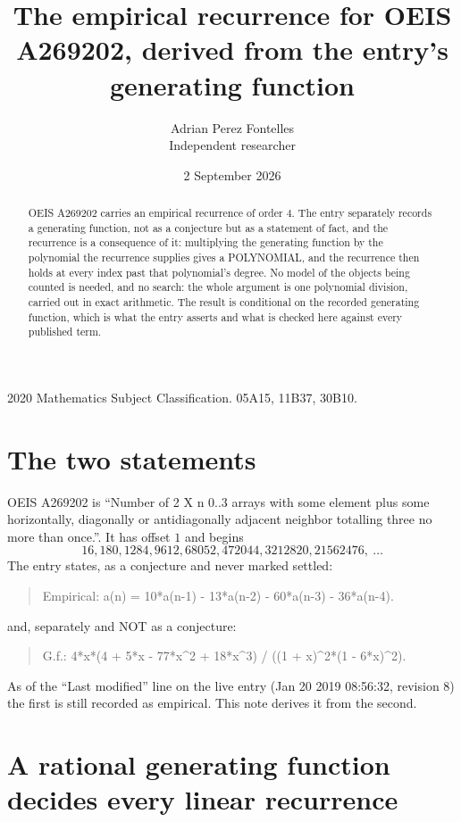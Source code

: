 \documentclass[11pt,a4paper]{article}
\title{The empirical recurrence for OEIS A269202, derived from the entry's generating function}
\author{Adrian Perez Fontelles\\ \small Independent researcher}
\date{2 September 2026}
\theoremstyle{plain}
\theoremstyle{definition}
\begin{document}
\maketitle

\begin{abstract}
OEIS A269202 carries an empirical recurrence of order $4$. The entry separately records a
generating function, not as a conjecture but as a statement of fact, and the recurrence is a
consequence of it: multiplying the generating function by the polynomial the recurrence
supplies gives a POLYNOMIAL, and the recurrence then holds at every index past that
polynomial's degree. No model of the objects being counted is needed, and no search: the
whole argument is one polynomial division, carried out in exact arithmetic. The result is
conditional on the recorded generating function, which is what the entry asserts and what is
checked here against every published term.
\end{abstract}

\noindent\small 2020 Mathematics Subject Classification. 05A15, 11B37, 30B10.\normalsize

\section{The two statements}

OEIS A269202 is ``Number of 2 X n 0..3 arrays with some element plus some horizontally, diagonally or antidiagonally adjacent neighbor totalling three no more than once.''. It has offset $1$ and begins
\[
16, 180, 1284, 9612, 68052, 472044, 3212820, 21562476,\ \dots
\]
The entry states, as a conjecture and never marked settled:
\begin{quote}
Empirical: a(n) = 10*a(n-1) - 13*a(n-2) - 60*a(n-3) - 36*a(n-4).
\end{quote}
and, separately and NOT as a conjecture:
\begin{quote}
G.f.: 4*x*(4 + 5*x - 77*x\^{}2 + 18*x\^{}3) / ((1 + x)\^{}2*(1 - 6*x)\^{}2).
\end{quote}
As of the ``Last modified'' line on the live entry (Jan 20 2019 08:56:32, revision 8) the first is still
recorded as empirical. This note derives it from the second.

\section{A rational generating function decides every linear recurrence}
\end{document}
